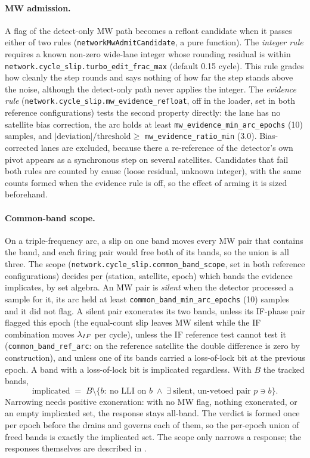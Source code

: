 \documentclass[main.tex]{subfiles}
\begin{document}
\paragraph{MW admission.}
A flag of the detect-only MW path becomes a refloat candidate when it passes
either of two rules (\texttt{networkMwAdmitCandidate}, a pure function).  The
\emph{integer rule} requires a known non-zero wide-lane integer whose
rounding residual is within \texttt{network.cycle\_slip.turbo\_edit\_frac\_max}
(default 0.15 cycle).  This rule grades how cleanly the step rounds and says
nothing of how far the step stands above the noise, although the detect-only
path never applies the integer.  The \emph{evidence rule}
(\texttt{network.cycle\_slip.mw\_evidence\_refloat}, off in the loader, set in
both reference configurations) tests the second property directly: the lane
has no satellite bias correction, the arc holds at least
\texttt{mw\_evidence\_min\_arc\_epochs} (10) samples, and
$\lvert\text{deviation}\rvert/\text{threshold} \ge$
\texttt{mw\_evidence\_ratio\_min} (3.0).  Bias-corrected lanes are excluded,
because there a re-reference of the detector's own pivot appears as a
synchronous step on several satellites.  Candidates that fail both rules are
counted by cause (loose residual, unknown integer), with the same counts
formed when the evidence rule is off, so the effect of arming it is sized
beforehand.

\paragraph{Common-band scope.}
On a triple-frequency arc, a slip on one band moves every MW pair that
contains the band, and each firing pair would free both of its bands, so the
union is all three.  The scope (\texttt{network.cycle\_slip.common\_band\_scope},
set in both reference configurations) decides per (station, satellite,
epoch) which bands the evidence implicates, by set algebra.  An MW pair is
\emph{silent} when the detector processed a sample for it, its arc held at
least \texttt{common\_band\_min\_arc\_epochs} (10) samples and it did not flag.
A silent pair exonerates its two bands, unless its IF-phase pair flagged this
epoch (the equal-count slip leaves MW silent while the IF combination moves
$\lambda_{IF}$ per cycle), unless the IF reference test cannot test it
(\texttt{common\_band\_ref\_arc}: on the reference satellite the double
difference is zero by construction), and unless one of its bands carried a
loss-of-lock bit at the previous epoch.  A band with a loss-of-lock bit is
implicated regardless.  With $B$ the tracked bands,
\begin{equation}
\text{implicated} \;=\; B \setminus \bigl\{ b :\ \text{no LLI on } b \;\wedge\;
  \exists\ \text{silent, un-vetoed pair } p \ni b \bigr\}.
\label{eq:cb-scope}
\end{equation}
Narrowing needs positive exoneration: with no MW flag, nothing exonerated, or
an empty implicated set, the response stays all-band.  The verdict is formed
once per epoch before the drains and governs each of them, so the per-epoch
union of freed bands is exactly the implicated set.  The scope only narrows a
response; the responses themselves are described in
.
\end{document}
